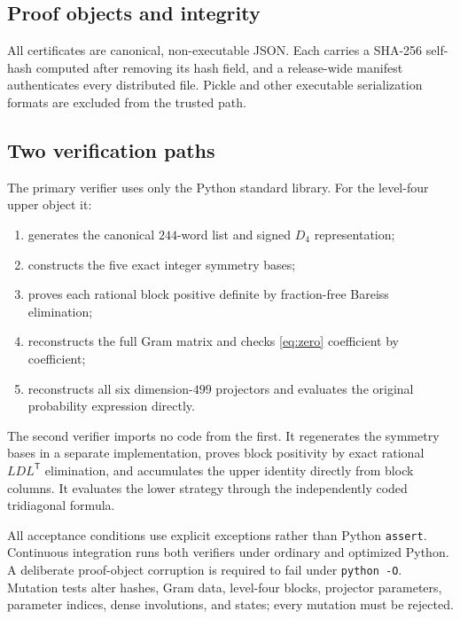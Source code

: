 \documentclass[11pt]{article}
\newcommand{\1}{\mathbb{1}}
\begin{document}
\subsection{Proof objects and integrity}
All certificates are canonical, non-executable JSON.  Each carries a SHA-256 self-hash computed after removing its hash field, and a release-wide manifest authenticates every distributed file.  Pickle and other executable serialization formats are excluded from the trusted path.

\subsection{Two verification paths}
The primary verifier uses only the Python standard library.  For the level-four upper object it:
\begin{enumerate}
\item generates the canonical $244$-word list and signed $D_4$ representation;
\item constructs the five exact integer symmetry bases;
\item proves each rational block positive definite by fraction-free Bareiss elimination;
\item reconstructs the full Gram matrix and checks \eqref{eq:zero} coefficient by coefficient;
\item reconstructs all six dimension-$499$ projectors and evaluates the original probability expression directly.
\end{enumerate}
The second verifier imports no code from the first.  It regenerates the symmetry bases in a separate implementation, proves block positivity by exact rational $LDL^{\mathsf T}$ elimination, and accumulates the upper identity directly from block columns.  It evaluates the lower strategy through the independently coded tridiagonal formula.

All acceptance conditions use explicit exceptions rather than Python \texttt{assert}.  Continuous integration runs both verifiers under ordinary and optimized Python.  A deliberate proof-object corruption is required to fail under \texttt{python -O}.  Mutation tests alter hashes, Gram data, level-four blocks, projector parameters, parameter indices, dense involutions, and states; every mutation must be rejected.
\end{document}
